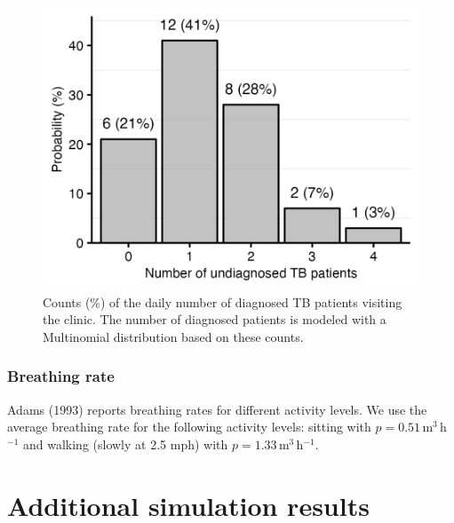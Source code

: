 \documentclass[fleqn,11pt]{wlscirep_supp}
\begin{document}
\begin{figure}[!htpb]
    \centering
    \includegraphics{results/inputs/undiagnosed-tb-patients.png}
    \caption[Counts of the daily number of diagnosed TB patients visiting the clinic]{Counts (\%) of the daily number of diagnosed TB patients visiting the clinic. The number of diagnosed patients is modeled with a Multinomial distribution based on these counts.}
    \label{fig:undiagnosed-distribution}
\end{figure}

\subsubsection{Breathing rate}

Adams (1993)\cite{Adams1993} reports breathing rates for different activity levels. We use the average breathing rate for the following activity levels: sitting with $p = 0.51$\,m$^3$\,h$^{-1}$ and walking (slowly at 2.5 mph) with $p = 1.33$\,m$^3$\,h$^{-1}$. 

\clearpage

\section{Additional simulation results}\label{sec:additional-results}
\end{document}
